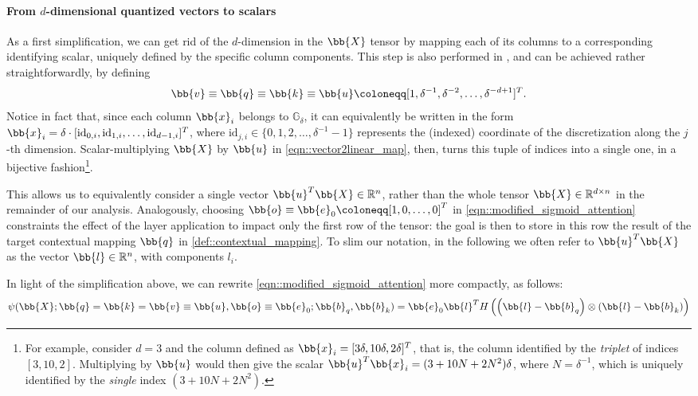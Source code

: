 \paragraph{From $d$-dimensional quantized vectors to scalars}
As a first simplification, we can get rid of the $d$-dimension in the $\bb{X}$ tensor by mapping each of its columns to a corresponding identifying scalar, uniquely defined by the specific column components. This step is also performed in \citet[App.~B.5]{Yun_UAP}, and can be achieved rather straightforwardly, by defining 
\begin{equation}\bb{v}\equiv\bb{q}\equiv\bb{k}\equiv\bb{u}\coloneqq[1,\delta^{-1},\delta^{-2},\dots,\delta^{-d+1}]^T.
    \label{eqn::vector2linear_map}
\end{equation}
Notice in fact that, since each column $\bb{x}_{i}$ belongs to $\mathbb{G}_\delta$, it can equivalently be written in the form $\bb{x}_{i}=\delta\cdot[\text{id}_{0,i}, \text{id}_{1,i},\dots,\text{id}_{d-1,i}]^T$, where $\text{id}_{j,i}\in\{0,1,2,\dots,\delta^{-1}-1\}$ represents the (indexed) coordinate of the discretization along the $j$-th dimension. Scalar-multiplying $\bb{X}$ by $\bb{u}$ in \cref{eqn::vector2linear_map}, then, turns this tuple of indices into a single one, in a bijective fashion\footnote{For example, consider $d=3$ and the column defined as $\bb{x}_{i} = [3\delta, 10\delta, 2\delta]^T$, that is, the column identified by the \emph{triplet} of indices $[3,10,2]$. Multiplying by $\bb{u}$ would then give the scalar $\bb{u}^T\bb{x}_{i} = (3 + 10N + 2N^2) \delta$, where $N=\delta^{-1}$, which is uniquely identified by the \emph{single} index $(3 + 10N + 2N^2)$.}.

This allows us to equivalently consider a single vector $\bb{u}^T\bb{X}\in\mathbb{R}^{n}$, rather than the whole tensor $\bb{X}\in\mathbb{R}^{d\times n}$ in the remainder of our analysis. Analogously, choosing $\bb{o}\equiv\bb{e}_0\coloneqq[1,0,\dots,0]^T$ in \cref{eqn::modified_sigmoid_attention} constraints the effect of the layer application to impact only the first row of the tensor: the goal is then to store in this row the result of the target contextual mapping $\bb{q}$ in \cref{def::contextual_mapping}.
To slim our notation, in the following we often refer to $\bb{u}^T\bb{X}$ as the vector $\bb{l}\in\mathbb{R}^{n}$, with components $l_i$.

In light of the simplification above, we can rewrite \cref{eqn::modified_sigmoid_attention} more compactly, as follows:
\begin{equation}
    \psi(\bb{X};\bb{q}=\bb{k}=\bb{v}\equiv\bb{u},\bb{o}\equiv\bb{e}_0;\bb{b}_q,\bb{b}_k) = \bb{e}_0\bb{l}^T H\left(\left(\bb{l}-\bb{b}_q\right)\otimes\left(\bb{l}-\bb{b}_k\right)\right)
    \label{eqn::modified_attention_1}
\end{equation}

